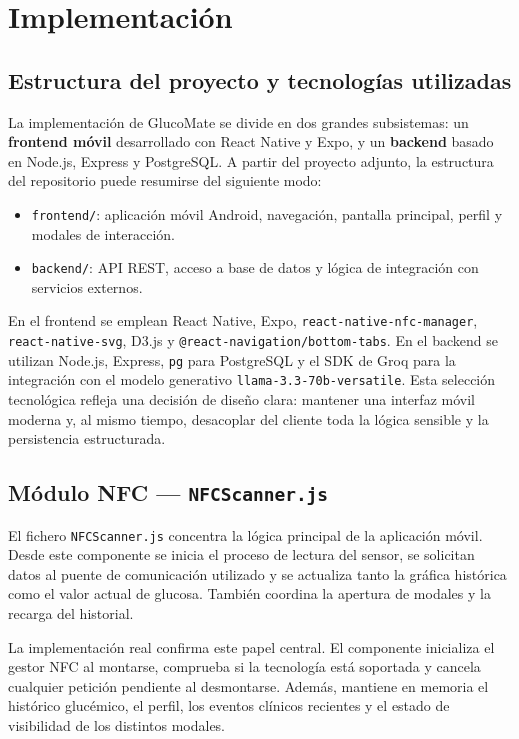 \chapter{Implementación}\label{cap:implementacion}

\section{Estructura del proyecto y tecnologías utilizadas}

La implementación de GlucoMate se divide en dos grandes subsistemas: un
\textbf{frontend móvil} desarrollado con React Native y Expo, y un \textbf{backend}
basado en Node.js, Express y PostgreSQL. A partir del proyecto adjunto, la estructura del
repositorio puede resumirse del siguiente modo:

\begin{itemize}
    \item \texttt{frontend/}: aplicación móvil Android, navegación, pantalla principal,
          perfil y modales de interacción.
    \item \texttt{backend/}: API REST, acceso a base de datos y lógica de integración con
          servicios externos.
\end{itemize}

En el frontend se emplean React Native, Expo, \texttt{react-native-nfc-manager},
\texttt{react-native-svg}, D3.js y \texttt{@react-navigation/bottom-tabs}. En el backend
se utilizan Node.js, Express, \texttt{pg} para PostgreSQL y el SDK de Groq para
la integración con el modelo generativo \texttt{llama-3.3-70b-versatile}. Esta selección tecnológica refleja una decisión
de diseño clara: mantener una interfaz móvil moderna y, al mismo tiempo, desacoplar del
cliente toda la lógica sensible y la persistencia estructurada.

\section{Módulo NFC --- \texttt{NFCScanner.js}}

El fichero \texttt{NFCScanner.js} concentra la lógica principal de la aplicación móvil.
Desde este componente se inicia el proceso de lectura del sensor, se solicitan datos al
puente de comunicación utilizado y se actualiza tanto la gráfica histórica como el valor
actual de glucosa. También coordina la apertura de modales y la recarga del historial.

La implementación real confirma este papel central. El componente inicializa el gestor
NFC al montarse, comprueba si la tecnología está soportada y cancela cualquier petición
pendiente al desmontarse. Además, mantiene en memoria el histórico glucémico, el perfil,
los eventos clínicos recientes y el estado de visibilidad de los distintos modales.


